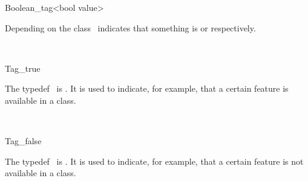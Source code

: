 
\begin{ccRefClass}{Boolean_tag<bool value>}

\ccDefinition

Depending on  the class \ccRefName\ indicates that
something is  or  respectively.


\ccConstants


\ccSeeAlso
{} \\

\end{ccRefClass}


\begin{ccRefClass}{Tag_true}

\ccDefinition

The typedef \ccRefName\ is .
It is used to indicate, for example,
that a certain feature is available in a class.



\ccSeeAlso
{} \\

\end{ccRefClass}


\begin{ccRefClass}{Tag_false}

\ccDefinition

The typedef \ccRefName\ is .
It is used to indicate, for example,
that a certain feature is not available in a class.



\ccSeeAlso
{} \\

\end{ccRefClass}




\ccParDims




